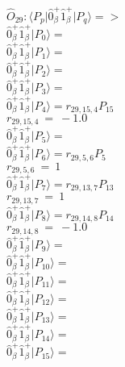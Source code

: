 \documentclass[14pt]{article}
\begin{document}
    $\hat{O}_{29}:  \langle{P_p}\vert \hat{0}_{\beta}^{+}\hat{1}_{\beta}^{+} \vert{P_q}\rangle => $ \\ 
    $ \hat{0}_{\beta}^{+}\hat{1}_{\beta}^{+} \vert{P_{0}}\rangle =  $ \\ 
    $ \hat{0}_{\beta}^{+}\hat{1}_{\beta}^{+} \vert{P_{1}}\rangle =  $ \\ 
    $ \hat{0}_{\beta}^{+}\hat{1}_{\beta}^{+} \vert{P_{2}}\rangle =  $ \\ 
    $ \hat{0}_{\beta}^{+}\hat{1}_{\beta}^{+} \vert{P_{3}}\rangle =  $ \\ 
    $ \hat{0}_{\beta}^{+}\hat{1}_{\beta}^{+} \vert{P_{4}}\rangle = {r}_{29,15,4}P_{15} $ \\ 
    ${r}_{29,15,4}\ =\ -1.0 $ \\ 
    $ \hat{0}_{\beta}^{+}\hat{1}_{\beta}^{+} \vert{P_{5}}\rangle =  $ \\ 
    $ \hat{0}_{\beta}^{+}\hat{1}_{\beta}^{+} \vert{P_{6}}\rangle = {r}_{29,5,6}P_{5} $ \\ 
    ${r}_{29,5,6}\ =\ 1 $ \\ 
    $ \hat{0}_{\beta}^{+}\hat{1}_{\beta}^{+} \vert{P_{7}}\rangle = {r}_{29,13,7}P_{13} $ \\ 
    ${r}_{29,13,7}\ =\ 1 $ \\ 
    $ \hat{0}_{\beta}^{+}\hat{1}_{\beta}^{+} \vert{P_{8}}\rangle = {r}_{29,14,8}P_{14} $ \\ 
    ${r}_{29,14,8}\ =\ -1.0 $ \\ 
    $ \hat{0}_{\beta}^{+}\hat{1}_{\beta}^{+} \vert{P_{9}}\rangle =  $ \\ 
    $ \hat{0}_{\beta}^{+}\hat{1}_{\beta}^{+} \vert{P_{10}}\rangle =  $ \\ 
    $ \hat{0}_{\beta}^{+}\hat{1}_{\beta}^{+} \vert{P_{11}}\rangle =  $ \\ 
    $ \hat{0}_{\beta}^{+}\hat{1}_{\beta}^{+} \vert{P_{12}}\rangle =  $ \\ 
    $ \hat{0}_{\beta}^{+}\hat{1}_{\beta}^{+} \vert{P_{13}}\rangle =  $ \\ 
    $ \hat{0}_{\beta}^{+}\hat{1}_{\beta}^{+} \vert{P_{14}}\rangle =  $ \\ 
    $ \hat{0}_{\beta}^{+}\hat{1}_{\beta}^{+} \vert{P_{15}}\rangle =  $ \\ 
    
\end{document}
